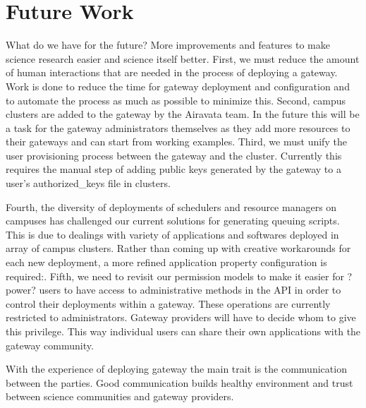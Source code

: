 \documentclass[sigconf]{acmart}
\begin{document}
\section{Future Work}

What do we have for the future? More improvements and features to make science research easier and science itself better. First, we must reduce the amount of human interactions that are needed in the process of deploying a gateway. Work is done to reduce the time for gateway deployment and configuration and to automate the process as much as possible to minimize this. Second, campus clusters are added to the gateway by the Airavata team.  In the future this will be a task for the gateway administrators themselves as they add more resources to their gateways and can start from working examples.  Third, we must unify the user provisioning process between the gateway and the cluster.  Currently this requires the manual step of adding public keys generated by the gateway to a user's authorized\_keys file in clusters. 

Fourth, the diversity of deployments of schedulers and resource managers on campuses has challenged our current solutions for generating queuing scripts. This is due to dealings with variety of applications and softwares deployed in array of campus clusters. Rather than coming up with creative workarounds for each new deployment, a more refined application property configuration is required:. Fifth, we need to revisit our permission models to make it easier for ?power? users to have access to administrative methods in the API in order to control their deployments within a gateway. These operations are currently restricted to administrators. Gateway providers will have to decide whom to give this privilege. This way individual users can share their own applications with the gateway community. 

With the experience of deploying gateway the main trait is the communication between the parties. Good communication builds healthy environment and trust between science communities and gateway providers.
   

%
%


 
\end{document}
